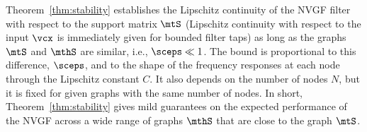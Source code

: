 Theorem~\ref{thm:stability} establishes the Lipschitz continuity of the NVGF filter with respect to the support matrix $\mtS$ (Lipschitz continuity with respect to the input $\vcx$ is immediately given for bounded filter taps) as long as the graphs $\mtS$ and $\mthS$ are similar, i.e., $\sceps \ll 1$. The bound is proportional to this difference, $\sceps$, and to the shape of the frequency responses at each node through the Lipschitz constant $C$. It also depends on the number of nodes $N$, but it is fixed for given graphs with the same number of nodes. In short, Theorem~\ref{thm:stability} gives mild guarantees on the expected performance of the NVGF across a wide range of graphs $\mthS$ that are close to the graph $\mtS$. %